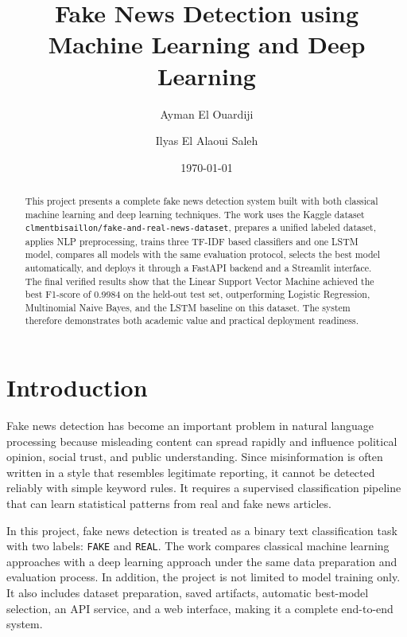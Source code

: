 \documentclass[12pt,a4paper]{article}
\title{Fake News Detection using Machine Learning and Deep Learning}
\author{Ayman El Ouardiji \and Ilyas El Alaoui Saleh}
\date{\today}
\begin{document}
\maketitle
\thispagestyle{empty}
\newpage

\begin{abstract}
This project presents a complete fake news detection system built with both classical machine learning and deep learning techniques. The work uses the Kaggle dataset \texttt{clmentbisaillon/fake-and-real-news-dataset}, prepares a unified labeled dataset, applies NLP preprocessing, trains three TF-IDF based classifiers and one LSTM model, compares all models with the same evaluation protocol, selects the best model automatically, and deploys it through a FastAPI backend and a Streamlit interface. The final verified results show that the Linear Support Vector Machine achieved the best F1-score of 0.9984 on the held-out test set, outperforming Logistic Regression, Multinomial Naive Bayes, and the LSTM baseline on this dataset. The system therefore demonstrates both academic value and practical deployment readiness.
\end{abstract}

\newpage

\section{Introduction}
Fake news detection has become an important problem in natural language processing because misleading content can spread rapidly and influence political opinion, social trust, and public understanding. Since misinformation is often written in a style that resembles legitimate reporting, it cannot be detected reliably with simple keyword rules. It requires a supervised classification pipeline that can learn statistical patterns from real and fake news articles.

In this project, fake news detection is treated as a binary text classification task with two labels: \texttt{FAKE} and \texttt{REAL}. The work compares classical machine learning approaches with a deep learning approach under the same data preparation and evaluation process. In addition, the project is not limited to model training only. It also includes dataset preparation, saved artifacts, automatic best-model selection, an API service, and a web interface, making it a complete end-to-end system.
\end{document}
